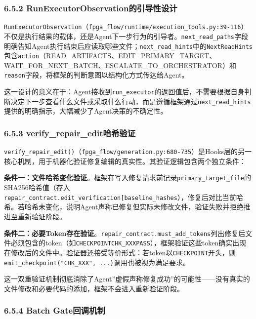 \subsubsection{6.5.2
RunExecutorObservation的引导性设计}\label{runexecutorobservationux7684ux5f15ux5bfcux6027ux8bbeux8ba1}

\texttt{RunExecutorObservation}（\texttt{fpga\_flow/runtime/execution\_tools.py:39-116}）不仅是执行结果的载体，还是Agent下一步行为的引导者。\texttt{next\_read\_paths}字段明确告知Agent执行结束后应读取哪些文件；\texttt{next\_read\_hints}中的\texttt{NextReadHints}包含\texttt{action}（READ\_ARTIFACTS、EDIT\_PRIMARY\_TARGET、WAIT\_FOR\_NEXT\_BATCH、ESCALATE\_TO\_ORCHESTRATOR）和\texttt{reason}字段，将框架的判断意图以结构化方式传达给Agent。

这一设计的意义在于：Agent接收到\texttt{run\_executor}的返回值后，不需要根据自身判断决定下一步查看什么文件或采取什么行动，而是遵循框架通过\texttt{next\_read\_hints}提供的明确指示，大幅减少了Agent决策的不确定性。

\subsubsection{6.5.3
verify\_repair\_edit哈希验证}\label{verify_repair_editux54c8ux5e0cux9a8cux8bc1}

\texttt{verify\_repair\_edit()}（\texttt{fpga\_flow/generation.py:680-735}）是Hooks层的另一核心机制，用于机器化验证修复编辑的真实性。其验证逻辑包含两个独立条件：

\textbf{条件一：文件哈希变化验证}。框架在写入修复请求前记录\texttt{primary\_target\_file}的SHA256哈希值（存入\texttt{repair\_contract.edit\_verification{[}\textquotesingle{}baseline\_hashes\textquotesingle{}{]}}），修复后对比当前哈希。若哈希未变化，说明Agent声称已修复但实际未修改文件，验证失败并拒绝推进至重新验证阶段。

\textbf{条件二：必要Token存在验证}。\texttt{repair\_contract.must\_add\_tokens}列出修复后文件必须包含的token（如\texttt{CHECKPOINT\textbar{}CHK\_XXX\textbar{}PASS\textbar{}}），框架验证这些token确实出现在修改后的文件中。验证器还接受等价形式：若token以\texttt{CHECKPOINT\textbar{}}开头，则\texttt{emit\_checkpoint("CHK\_XXX",\ ...)}调用也被视为满足要求。

这一双重验证机制彻底消除了Agent''虚假声称修复成功''的可能性------没有真实的文件修改和必要代码的添加，框架不会进入重新验证阶段。

\subsubsection{6.5.4 Batch
Gate回调机制}\label{batch-gateux56deux8c03ux673aux5236}


